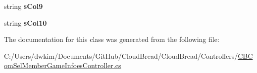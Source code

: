 \begin{DoxyCompactItemize}
\item 
string {\bfseries s\+Col9}\hypertarget{class_cloud_bread_1_1_controllers_1_1_c_b_com_sel_member_game_infoes_controller_1_1_model_a6c252447937ec3aab00ce0a2caa302d1}{}\label{class_cloud_bread_1_1_controllers_1_1_c_b_com_sel_member_game_infoes_controller_1_1_model_a6c252447937ec3aab00ce0a2caa302d1}

\item 
string {\bfseries s\+Col10}\hypertarget{class_cloud_bread_1_1_controllers_1_1_c_b_com_sel_member_game_infoes_controller_1_1_model_a01d14ce532eebee963f4506c21b63724}{}\label{class_cloud_bread_1_1_controllers_1_1_c_b_com_sel_member_game_infoes_controller_1_1_model_a01d14ce532eebee963f4506c21b63724}

\end{DoxyCompactItemize}


The documentation for this class was generated from the following file\+:\begin{DoxyCompactItemize}
\item 
C\+:/\+Users/dwkim/\+Documents/\+Git\+Hub/\+Cloud\+Bread/\+Cloud\+Bread/\+Controllers/\hyperlink{_c_b_com_sel_member_game_infoes_controller_8cs}{C\+B\+Com\+Sel\+Member\+Game\+Infoes\+Controller.\+cs}\end{DoxyCompactItemize}
